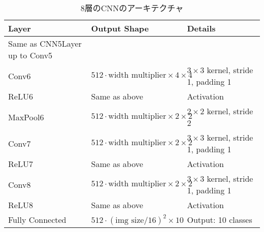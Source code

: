 \begin{table}[h]
    \centering
    \caption{8層のCNNのアーキテクチャ}
    \label{tab:cnn8layer}
    \begin{tabular}{lll}
    \toprule
    \textbf{Layer} & \textbf{Output Shape} & \textbf{Details} \\
    \midrule
    Same as CNN5Layer up to Conv5 & & \\
    Conv6 & $512 \cdot \text{width multiplier} \times 4 \times 4$ & $3 \times 3$ kernel, stride 1, padding 1 \\
    ReLU6 & Same as above & Activation \\
    MaxPool6 & $512 \cdot \text{width multiplier} \times 2 \times 2$ & $2 \times 2$ kernel, stride 2 \\
    Conv7 & $512 \cdot \text{width multiplier} \times 2 \times 2$ & $3 \times 3$ kernel, stride 1, padding 1 \\
    ReLU7 & Same as above & Activation \\
    Conv8 & $512 \cdot \text{width multiplier} \times 2 \times 2$ & $3 \times 3$ kernel, stride 1, padding 1 \\
    ReLU8 & Same as above & Activation \\
    Fully Connected & $512 \cdot (\text{img size}/16)^2 \times 10$ & Output: 10 classes \\
    \bottomrule
    \end{tabular}
\end{table}

